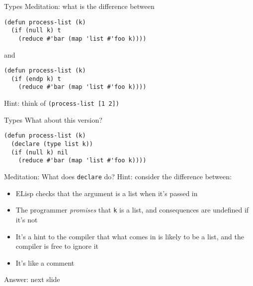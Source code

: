 \documentclass[presentation]{beamer}
\begin{document}
\begin{frame}[fragile]{Types}
  Meditation: what is the difference between
\begin{verbatim}
(defun process-list (k)
  (if (null k) t
    (reduce #'bar (map 'list #'foo k))))
\end{verbatim}
and
\begin{verbatim}
(defun process-list (k)
  (if (endp k) t
    (reduce #'bar (map 'list #'foo k))))
\end{verbatim}
\medskip

Hint: think of \texttt{(process-list [1 2])}
\end{frame}

\begin{frame}[fragile]{Types}
  What about this version?
\begin{verbatim}
(defun process-list (k)
  (declare (type list k))
  (if (null k) nil
    (reduce #'bar (map 'list #'foo k))))
\end{verbatim}

Meditation: What does \texttt{declare} do?  Hint: consider the difference between:
\begin{itemize}
\item ELisp checks that the argument is a list when it's passed in
\item The programmer \emph{promises} that \texttt{k} is a list, and consequences are undefined if it's not
\item It's a hint to the compiler that what comes in is likely to be a list, and the compiler is free to ignore it
\item It's like a comment
\end{itemize}
Answer: next slide
\end{frame}
\end{document}
